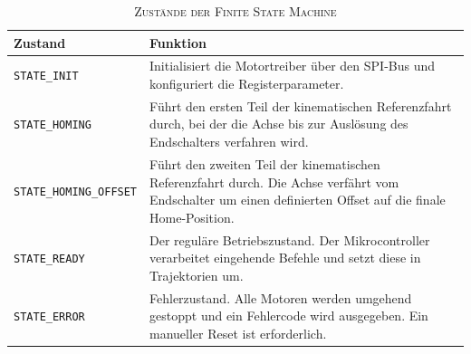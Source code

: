 \begin{table}[htbp]
	\footnotesize 
	\centering
	\caption[Zustände der Finite State Machine]{\textsc{Zustände der Finite State Machine}}
	\label{tab:fsm_states}
	
	\begin{tabularx}{\linewidth}{l X}
		\toprule
		\textbf{Zustand} & \textbf{Funktion} \\
		\midrule
		\texttt{STATE\_INIT}          & Initialisiert die Motortreiber über den SPI-Bus und konfiguriert die Registerparameter. \\
		\addlinespace 
		\texttt{STATE\_HOMING}        & Führt den ersten Teil der kinematischen Referenzfahrt durch, bei der die Achse bis zur Auslösung des Endschalters verfahren wird. \\
		\addlinespace
		\texttt{STATE\_HOMING\_OFFSET} & Führt den zweiten Teil der kinematischen Referenzfahrt durch. Die Achse verfährt vom Endschalter um einen definierten Offset auf die finale Home-Position. \\
		\addlinespace
		\texttt{STATE\_READY}         & Der reguläre Betriebszustand. Der Mikrocontroller verarbeitet eingehende Befehle und setzt diese in Trajektorien um. \\
		\addlinespace
		\texttt{STATE\_ERROR}         & Fehlerzustand. Alle Motoren werden umgehend gestoppt und ein Fehlercode wird ausgegeben. Ein manueller Reset ist erforderlich. \\
		\bottomrule
	\end{tabularx}
\end{table}
\newpage
%
%
%
